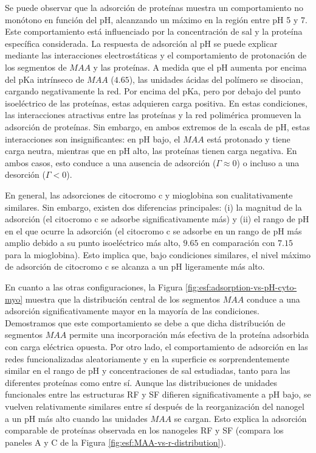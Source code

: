  Se puede observar que la adsorci\'on de prote\'inas muestra un comportamiento no mon\'otono en funci\'on del pH, alcanzando un m\'aximo en la regi\'on entre pH 5 y 7. Este comportamiento est\'a influenciado por la concentraci\'on de sal y la prote\'ina espec\'ifica considerada. La respuesta de adsorci\'on al pH se puede explicar mediante las interacciones electrost\'aticas y el comportamiento de protonaci\'on de los segmentos de $MAA$ y las prote\'inas. A medida que el pH aumenta por encima del pKa intr\'inseco de $MAA$ ($4.65$), las unidades \'acidas del pol\'imero se disocian, cargando negativamente la red. Por encima del pKa, pero por debajo del punto isoel\'ectrico de las prote\'inas, estas adquieren carga positiva. En estas condiciones, las interacciones atractivas entre las prote\'inas y la red polim\'erica promueven la adsorci\'on de prote\'inas. Sin embargo, en ambos extremos de la escala de pH, estas interacciones son insignificantes: en pH bajo, el $MAA$ est\'a protonado y tiene carga neutra, mientras que en pH alto, las prote\'inas tienen carga negativa. En ambos casos, esto conduce a una ausencia de adsorci\'on ($\Gamma \approx 0$) o incluso a una desorci\'on ($\Gamma < 0$).
 
 
 
 
En general, las adsorciones de citocromo c y mioglobina son cualitativamente similares. Sin embargo, existen dos diferencias principales: (i) la magnitud de la adsorci\'on (el citocromo c se adsorbe significativamente m\'as) y (ii) el rango de pH en el que ocurre la adsorci\'on (el citocromo c se adsorbe en un rango de pH m\'as amplio debido a su punto isoel\'ectrico más alto, $9.65$ en comparaci\'on con $7.15$ para la mioglobina). Esto implica que, bajo condiciones similares, el nivel m\'aximo de adsorción de citocromo c se alcanza a un pH ligeramente m\'as alto.

En cuanto a las otras configuraciones, la Figura \ref{fig:esf:adsorption-vs-pH-cyto-myo} muestra que la distribuci\'on central de los segmentos $MAA$ conduce a una adsorci\'on significativamente mayor en la mayor\'ia de las condiciones. Demostramos que este comportamiento se debe a que dicha distribuci\'on de segmentos $MAA$ permite una incorporaci\'on m\'as efectiva de la prote\'ina adsorbida con carga el\'ectrica opuesta. Por otro lado, el comportamiento de adsorci\'on en las redes funcionalizadas aleatoriamente y en la superficie es sorprendentemente similar en el rango de pH y concentraciones de sal estudiadas, tanto para las diferentes prote\'inas como entre s\'i. Aunque las distribuciones de unidades funcionales entre las estructuras RF y SF difieren significativamente a pH bajo, se vuelven relativamente similares entre s\'i despu\'es de la reorganizaci\'on del nanogel a un pH m\'as alto cuando las unidades $MAA$ se cargan. Esto explica la adsorci\'on comparable de prote\'inas observada en los nanogeles RF y SF (compara los paneles A y C de la Figura \ref{fig:esf:MAA-vs-r-distribution}).



